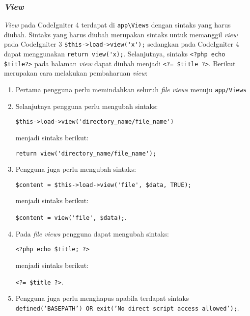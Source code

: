 \subsubsection{\textit{View}}
\textit{View} pada CodeIgniter 4 terdapat di \verb|app\Views| dengan sintaks yang harus diubah. Sintaks yang harus diubah merupakan sintaks untuk memanggil \textit{view} pada CodeIgniter 3 \verb|$this->load->view('x');| sedangkan pada CodeIgniter 4 dapat menggunakan \verb|return view('x);|. Selanjutnya, sintaks \verb|<?php echo $title?>| pada halaman \textit{view} dapat diubah menjadi
 \verb|<?= $title ?>|. Berikut merupakan cara melakukan pembaharuan \textit{view}:
\begin{enumerate}
\item Pertama pengguna perlu memindahkan seluruh \textit{file views} menuju \verb|app/Views|
\item Selanjutnya pengguna perlu mengubah sintaks:
\begin{center}
	\verb|$this->load->view('directory_name/file_name')|
\end{center}
menjadi sintaks berikut:
\begin{center}
	\verb|return view('directory_name/file_name');|
\end{center}
\item Pengguna juga perlu mengubah sintaks:
\begin{center}
	\verb|$content = $this->load->view('file', $data, TRUE);|
\end{center}	
	 menjadi sintaks berikut:
\begin{center}
	\verb|$content = view('file', $data);|.
\end{center}
\item Pada \textit{file views} pengguna dapat mengubah sintaks:
\begin{center} 
	\verb|<?php echo $title; ?>|
\end{center}
menjadi sintaks berikut:
\begin{center}
	\verb|<?= $title ?>|.
\end{center}
\item Pengguna juga perlu menghapus apabila terdapat sintaks \texttt{defined('BASEPATH') OR exit('No direct script access allowed');}.
\end{enumerate}
 
